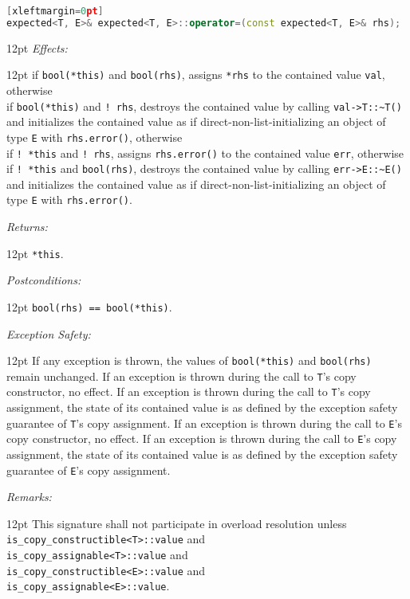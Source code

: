 \documentclass[a4paper,10pt]{article}
\newcommand{\cpp}[1]{\lstinline{#1}}
\newcommand{\wordingItem}[1]{\noindent\textit{#1:}}
\newenvironment{wordingTextItem}[1]{\wordingItem{#1}\vspace{2pt}\noindent\begin{adjustwidth}{12pt}{}}{\vspace{2pt}\end{adjustwidth}}
\newenvironment{wordingPara}{\begin{adjustwidth}{12pt}{}}{\end{adjustwidth}}
\begin{document}
\begin{lstlisting}[language=C++][xleftmargin=0pt]
expected<T, E>& expected<T, E>::operator=(const expected<T, E>& rhs); 
\end{lstlisting}
\begin{wordingPara}
\begin{wordingTextItem}{Effects}
if \cpp{bool(*this)} and \cpp{bool(rhs)}, assigns \cpp{*rhs} to the contained value \cpp{val}, otherwise \\
if \cpp{bool(*this)} and \cpp{! rhs}, destroys the contained value by calling \cpp{val->T::~T()} and  initializes the contained value as if direct-non-list-initializing an object of type \cpp{E} with \cpp{rhs.error()}, otherwise \\
if \cpp{! *this} and \cpp{! rhs}, assigns \cpp{rhs.error()} to the contained value \cpp{err}, otherwise \\
if \cpp{! *this} and \cpp{bool(rhs)}, destroys the contained value by calling \cpp{err->E::~E()} and  initializes the contained value as if direct-non-list-initializing an object of type \cpp{E} with \cpp{rhs.error()}.
\end{wordingTextItem}
\begin{wordingTextItem}{Returns}
\cpp{*this}.
\end{wordingTextItem}
\begin{wordingTextItem}{Postconditions}
\cpp{bool(rhs) == bool(*this)}.
\end{wordingTextItem}
\begin{wordingTextItem}{Exception Safety}
If any exception is thrown, the values of \cpp{bool(*this)} and \cpp{bool(rhs)} remain unchanged. If an exception is thrown during the call to \cpp{T}'s copy constructor, no effect. If an exception is thrown during the call to \cpp{T}'s copy assignment, the state of its contained value is as defined by the exception safety guarantee of \cpp{T}'s copy assignment. If an exception is thrown during the call to \cpp{E}'s copy constructor, no effect. If an exception is thrown during the call to \cpp{E}'s copy assignment, the state of its contained value is as defined by the exception safety guarantee of \cpp{E}'s copy assignment.
\end{wordingTextItem}
\begin{wordingTextItem}{Remarks}
This signature shall not participate in overload resolution unless\\
\cpp{is_copy_constructible<T>::value} and\\
\cpp{is_copy_assignable<T>::value} and\\
\cpp{is_copy_constructible<E>::value} and\\
\cpp{is_copy_assignable<E>::value}.
\end{wordingTextItem}

\end{wordingPara}
\end{document}
